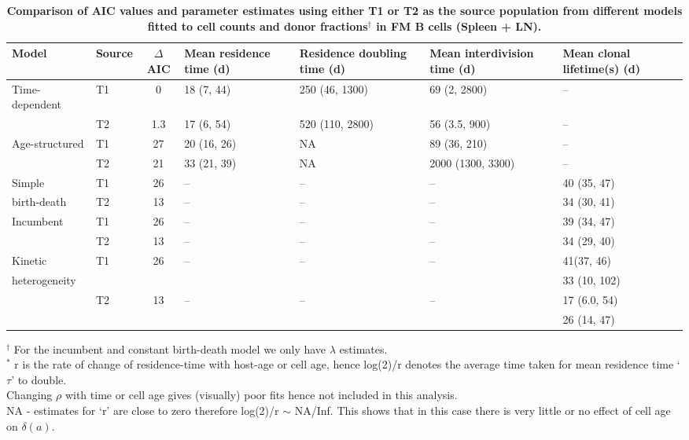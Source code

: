 \documentclass[11pt]{article}
\begin{document}
\begin{table}[h!]
	\small{
		\begin{center}
			\renewcommand{\arraystretch}{1.25}
			\begin{tabular}{ l  l  c  m{1.5cm}  m{2.3cm}  m{2.5cm}  m{2.2cm} } 
				\toprule[0.05cm]
				\textbf{Model} & \textbf{Source}  & \textbf{$\Delta$AIC} & \textbf{\nohyphens{Mean residence time (d)}}  & \textbf{\nohyphens{Residence doubling time (d)}}  & \textbf{\nohyphens{Mean interdivision time (d)}} & \textbf{\nohyphens{Mean clonal lifetime(s) (d)}}  \\
				\hline
				Time-dependent & T1 & 0   & 18 (7, 44) & 250 (46, 1300)  & 69 (2, 2800)  &  --   \\
				& T2 & 1.3 & 17 (6, 54) & 520 (110, 2800) & 56 (3.5, 900) &  --   \\  
				\hline
				Age-structured & T1 & 27   & 20 (16, 26) & NA  &  89 (36, 210)     &  --  \\
				& T2 & 21   & 33 (21, 39) & NA  & 2000 (1300, 3300) &  --  \\  
				\hline
				Simple & T1 & 26   & -- & --  &  -- & 40 (35, 47)  \\
				birth-death& T2 & 13   & -- & --  &  -- & 34 (30, 41) \\  
				\hline
				Incumbent   & T1 & 26   & -- & --  &  -- & 39 (34, 47)  \\
				& T2 & 13   & -- & --  &  -- & 34 (29, 40)  \\  
				\hline
				Kinetic & T1 & 26   & -- & --  &  -- & 41(37, 46)  \\
				heterogeneity &  &    &  &   &   &  33 (10, 102)  \\
				  & T2 & 13   & -- & --  &  -- & 17 (6.0, 54) \\
				  &  &    &  &   &   & 26 (14, 47)  \\  
				\hline
				\toprule 
			\end{tabular}
		\end{center}
		\caption{\small \textbf{Comparison of AIC values and parameter estimates using either T1 or T2 as the source population from different models fitted to cell counts and donor fractions$^{\dagger}$ in FM B cells (Spleen + LN).}}
		$^{\dagger}$ \footnotesize For the incumbent and constant birth-death model we only have $\lambda$ estimates. \\
		$^\ast$ \footnotesize r is the rate of change of residence-time with host-age or cell age, hence log(2)/r denotes the average time taken for mean residence time `$\tau$' to double. \\ Changing $\rho$ with time or cell age gives (visually) poor fits hence not included in this analysis. \\
		\footnotesize NA - estimates for `r' are close to zero therefore log(2)/r $\sim$ NA/Inf. This shows that in this case there is very little or no effect of cell age on $\delta(a)$.
		\label{tab:FMs_extended}
	}
\end{table} 
\end{document}
